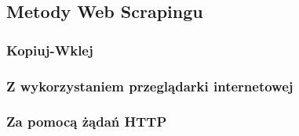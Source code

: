 \subsection{Metody Web Scrapingu}\label{subsec:web-scraping-methods}

\subsubsection{Kopiuj-Wklej}

\subsubsection{Z wykorzystaniem przeglądarki internetowej}

\subsubsection{Za pomocą żądań HTTP}
